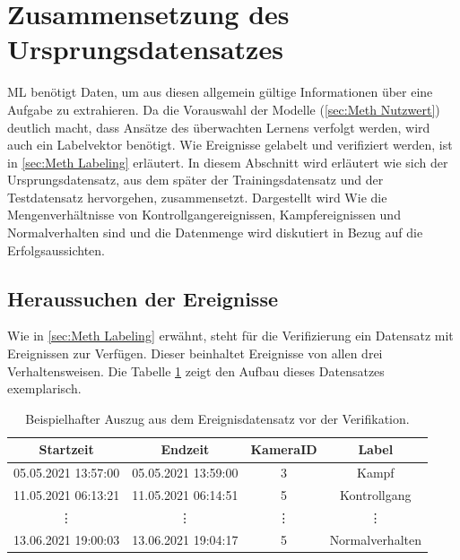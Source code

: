 \section{Zusammensetzung des Ursprungsdatensatzes} \label{sec:Meth Datensatz}
\Gls{ML} benötigt Daten, um aus diesen allgemein gültige Informationen über eine Aufgabe zu extrahieren. Da die Vorauswahl der Modelle (\ref{sec:Meth Nutzwert}) deutlich macht, dass Ansätze des überwachten Lernens verfolgt werden, wird auch ein \gls{Labelvektor} benötigt. Wie Ereignisse gelabelt und verifiziert werden, ist in \ref{sec:Meth Labeling} erläutert. In diesem Abschnitt wird erläutert wie sich der Ursprungsdatensatz, aus dem später der Trainingsdatensatz und der Testdatensatz hervorgehen, zusammensetzt. Dargestellt wird Wie die Mengenverhältnisse von Kontrollgangereignissen, Kampfereignissen und Normalverhalten sind und die Datenmenge wird diskutiert in Bezug auf die Erfolgsaussichten. 

\subsection{Heraussuchen der Ereignisse}
Wie in \ref{sec:Meth Labeling} erwähnt, steht für die Verifizierung ein Datensatz mit Ereignissen zur Verfügen. Dieser beinhaltet Ereignisse von allen drei Verhaltensweisen. Die Tabelle \ref{tab:bspUnvDataSet} zeigt den Aufbau dieses Datensatzes exemplarisch. 


\begin{table}[ht]
    \centering
    \caption{Beispielhafter Auszug aus dem Ereignisdatensatz vor der Verifikation.}
    \begin{tabular}{|c|c|c|c|}
        \hline
        Startzeit & Endzeit & KameraID & Label\\
        \hline
        05.05.2021 13:57:00 & 05.05.2021 13:59:00 & 3       & Kampf\\
        \hline
        11.05.2021 06:13:21 & 11.05.2021 06:14:51 & 5       & Kontrollgang\\
        \hline
        \vdots              & \vdots              & \vdots  & \vdots\\
        \hline
        13.06.2021 19:00:03 & 13.06.2021 19:04:17 & 5       & Normalverhalten\\
        \hline
    \end{tabular}
    \label{tab:bspUnvDataSet}
\end{table}

